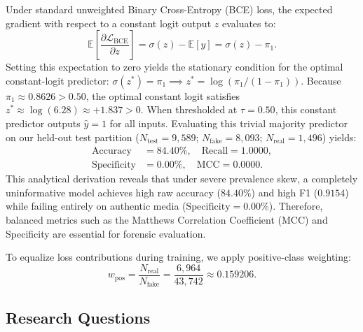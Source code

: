 \documentclass[conference]{IEEEtran}
\begin{document}
Under standard unweighted Binary Cross-Entropy (BCE) loss, the expected gradient with respect to a constant logit output $z$ evaluates to:
\begin{equation}
\mathbb{E}\left[\frac{\partial \mathcal{L}_{\text{BCE}}}{\partial z}\right] = \sigma(z) - \mathbb{E}[y] = \sigma(z) - \pi_1.
\end{equation}
Setting this expectation to zero yields the stationary condition for the optimal constant-logit predictor: $\sigma(z^*) = \pi_1 \implies z^* = \log(\pi_1 / (1 - \pi_1))$. Because $\pi_1 \approx 0.8626 > 0.50$, the optimal constant logit satisfies $z^* \approx \log(6.28) \approx +1.837 > 0$. When thresholded at $\tau = 0.50$, this constant predictor outputs $\hat{y} = 1$ for all inputs. Evaluating this trivial majority predictor on our held-out test partition ($N_{\text{test}} = 9,589$; $N_{\text{fake}} = 8,093$; $N_{\text{real}} = 1,496$) yields:
\begin{align}
\text{Accuracy} &= 84.40\%, \quad \text{Recall} = 1.0000, \nonumber \\
\text{Specificity} &= 0.00\%, \quad \text{MCC} = 0.0000.
\end{align}
This analytical derivation reveals that under severe prevalence skew, a completely uninformative model achieves high raw accuracy ($84.40\%$) and high F1 ($0.9154$) while failing entirely on authentic media ($\text{Specificity} = 0.00\%$). Therefore, balanced metrics such as the Matthews Correlation Coefficient (MCC) \cite{chicco2020advantages} and Specificity are essential for forensic evaluation.

To equalize loss contributions during training, we apply positive-class weighting:
\begin{equation}
w_{\text{pos}} = \frac{N_{\text{real}}}{N_{\text{fake}}} = \frac{6{,}964}{43{,}742} \approx 0.159206.
\end{equation}

\subsection{Research Questions}
\end{document}

